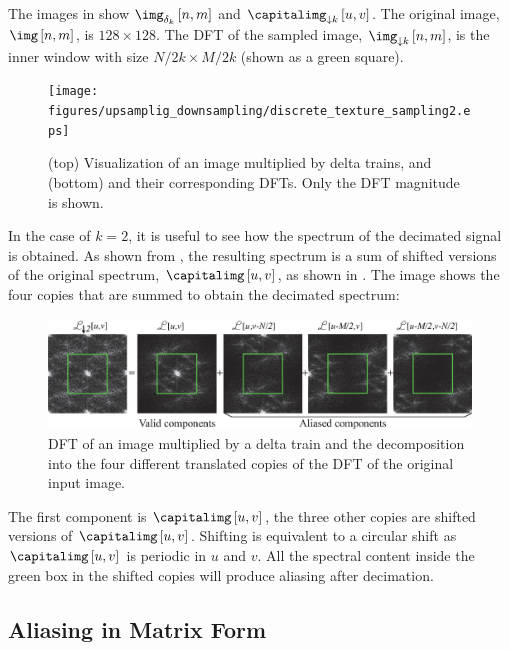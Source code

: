 The images in \fig{\ref{fig:discrete_texture_sampling}} show $\img_{\delta_k} \left[n,m\right]$ and $\capitalimg_{\downarrow k} \left[u,v\right]$. The original image, $\img \left[n,m\right]$, is $128 \times 128$. The DFT of the sampled image, $\img_{\downarrow k} \left[n,m\right]$, is the inner window with size $N/2k \times M/2k$ (shown as a green square).

\begin{figure}[h]
\centerline{
\texttt{[image: figures/upsamplig\_downsampling/discrete\_texture\_sampling2.eps]}
}
\caption{(top) Visualization of an image multiplied by delta trains, and (bottom) and their corresponding DFTs. Only the DFT magnitude is shown.}
\label{fig:discrete_texture_sampling}
\end{figure}

In the case of $k=2$, it is useful to see how the spectrum of the decimated signal is obtained. As shown from \eqn{\ref{eq:decimationFT}}, the resulting spectrum is a sum of shifted versions of the original spectrum, $\capitalimg \left[u,v\right]$, as shown in \fig{\ref{fig:components_aliasing_FT}}. The image shows the four copies that are summed to obtain the decimated spectrum:


\begin{figure}[h]
\centerline{
\includegraphics[width=1\linewidth]{figures/upsamplig_downsampling/components_aliasing_FT2.eps}
}
\caption{DFT of an image multiplied by a delta train and the decomposition into the four different translated copies of the DFT of the original input image.}
\label{fig:components_aliasing_FT}
\end{figure}

The first component is $\capitalimg \left[u,v\right]$, the three other copies are shifted versions of $\capitalimg \left[u,v\right]$. Shifting is equivalent to a circular shift as $\capitalimg \left[u,v\right]$ is periodic in $u$ and $v$. All the spectral content inside the green box in the shifted copies will produce aliasing after decimation. 

\subsection{Aliasing in Matrix Form}

